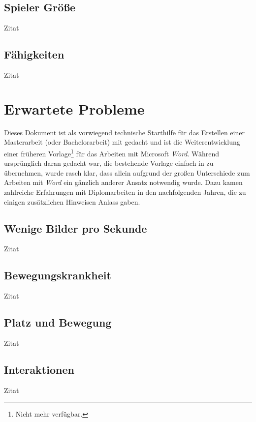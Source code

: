 \subsection{Spieler Größe}
Zitat

\subsection{Fähigkeiten}
Zitat

\section{Erwartete Probleme}
Dieses Dokument ist als vorwiegend technische Starthilfe für das
Erstellen einer Masterarbeit (oder Bachelorarbeit) mit \latex
gedacht und ist die Weiterentwicklung einer früheren
Vorlage\footnote{Nicht mehr verfügbar.} für das Arbeiten mit
Microsoft \emph{Word}. Während ursprünglich daran gedacht war, die
bestehende Vorlage einfach in \latex zu übernehmen, wurde rasch
klar, dass allein aufgrund der großen Unterschiede zum Arbeiten
mit \emph{Word} ein gänzlich anderer Ansatz notwendig wurde. Dazu
kamen zahlreiche Erfahrungen mit Diplomarbeiten in den
nachfolgenden Jahren, die zu einigen zusätzlichen Hinweisen Anlass gaben.

\subsection{Wenige Bilder pro Sekunde}
Zitat

\subsection{Bewegungskrankheit}
Zitat

\subsection{Platz und Bewegung}
Zitat

\subsection{Interaktionen}
Zitat